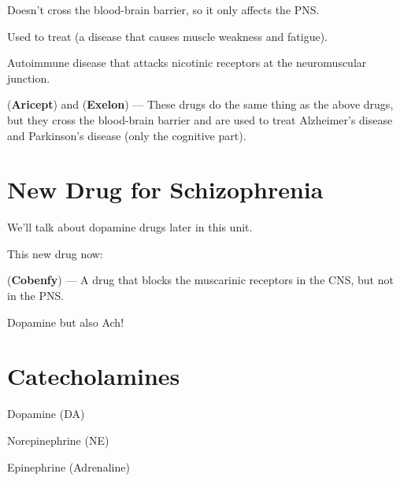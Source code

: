 \begin{coloredlist}
\begin{coloredlist}
\begin{coloredlist}
            \begin{coloredlist}
                \item Doesn't cross the blood-brain barrier, so it only affects the PNS.
                \item Used to treat  (a disease that causes muscle weakness and fatigue).
                \begin{coloredlist}
                    \item Autoimmune disease that attacks nicotinic receptors at the neuromuscular junction.
                \end{coloredlist}
            \end{coloredlist}
            \item {} (\textbf{Aricept}) and  (\textbf{Exelon}) — These drugs do the same thing as the above drugs, but they cross the blood-brain barrier and are used to treat Alzheimer's disease and Parkinson's disease (only the cognitive part).
        \end{coloredlist}
    \end{coloredlist}
\end{coloredlist}

\section{New Drug for Schizophrenia}

\begin{coloredlist}
    \item We'll talk about dopamine drugs later in this unit.
    \item This new drug now:
    \begin{coloredlist}
        \item {} (\textbf{Cobenfy}) — A drug that blocks the muscarinic receptors in the CNS, but not in the PNS.
        \item Dopamine but also Ach!
    \end{coloredlist}
\end{coloredlist}

\section{Catecholamines}

\begin{coloredlist}
    \item Dopamine (DA)
    \item Norepinephrine (NE)
    \item Epinephrine (Adrenaline)
\end{coloredlist}

